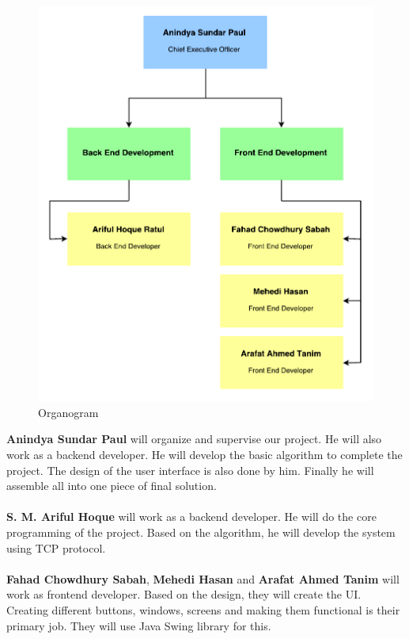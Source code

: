 \documentclass[12pt, a4paper]{article}
\begin{document}
\begin{figure}[h!]
\centering
\includegraphics[scale=0.8]{remote-pc-controller-organogram}
\caption{Organogram}
\end{figure}

\textbf{Anindya Sundar Paul} will organize and supervise our project. He will also work as a backend developer. He will develop the basic algorithm to complete the project. The design of the user interface is also done by him. Finally he will assemble all into one piece of final solution.\\ \\

\textbf{S. M. Ariful Hoque} will work as a backend developer. He will do the core programming of the project. Based on the algorithm, he will develop the system using TCP protocol.\\ \\

\textbf{Fahad Chowdhury Sabah}, \textbf{Mehedi Hasan} and \textbf{Arafat Ahmed Tanim} will work as frontend developer. Based on the design, they will create the UI. Creating different buttons, windows, screens and making them functional is their primary job. They will use Java Swing library for this.\\ \\
\end{document}
